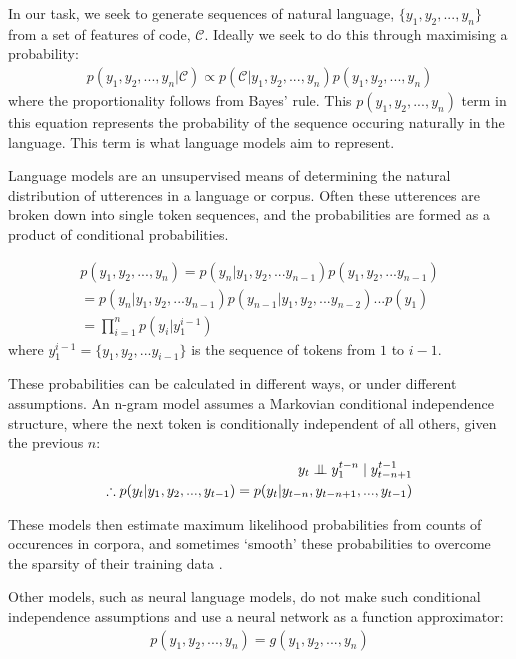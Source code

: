 In our task, we seek to generate sequences of natural language, $\{y_1, y_2,..., y_n\}$ from a set of features of code, $\mathcal{C}$.
Ideally we seek to do this through maximising a probability:
\begin{align}
p(y_1, y_2,...,y_n | \mathcal{C}) \propto p(\mathcal{C} | y_1, y_2,...,y_n )  p(y_1, y_2,...,y_n )
\end{align}
where the proportionality follows from Bayes' rule.
This $p(y_1, y_2,...,y_n )$ term in this equation represents the probability of the sequence occuring naturally in the language. This term is what  language models aim to represent.

Language models are an unsupervised means of determining the natural distribution of utterences in a language or corpus. 
Often these utterences are broken down into single token sequences, and the probabilities are formed as a product of conditional probabilities.

\begin{align}
p(y_1, y_2,...,y_n ) = p(y_n | y_1, y_2,...y_{n-1} )  p(y_1, y_2,...y_{n-1} ) \\
= p(y_n | y_1, y_2,...y_{n-1} ) p(y_{n-1} | y_1, y_2,...y_{n-2} )...p(y_1) \nonumber\\
 = \prod_{i=1}^{n} p(y_i | y_1^{i-1} )  
\end{align}
where $y_1^{i-1} =  \{y_1, y_2,...y_{i-1}\}$ is the sequence of tokens from $1$ to $i-1$.

These probabilities can be calculated in different ways, or under different assumptions. An n-gram model assumes a Markovian conditional independence structure, where the next token is conditionally independent of all others, given the previous $n$: 
\begin{align}
 y_t \mathrel{\perp\mspace{-10mu}\perp} y_1^{t-n} \mid y^{t-1}_{t-n+1}  \\
\therefore p(y_t | y_1, y_2,..., y_{t-1} )  = p(y_t | y_{t-n}, y_{t-n+1},..., y_{t-1}  ) 
\end{align}

These models then estimate maximum likelihood probabilities from counts of occurences in corpora, and sometimes `smooth' these probabilities to overcome the sparsity of their training data \citep{Chen:1996:ESS:981863.981904}.

Other models, such as neural language models, do not make such conditional independence assumptions and use a neural network as a function approximator:
\begin{align}
p(y_1, y_2,...,y_n ) = g(y_1, y_2,...,y_n)
\end{align}

